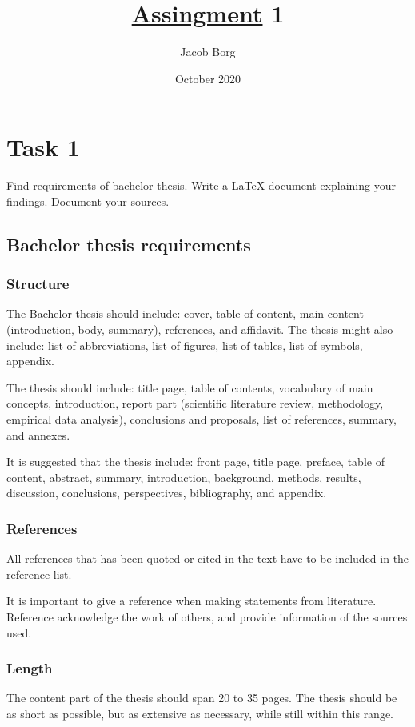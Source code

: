 \documentclass[a4paper]{article}
\title{\href{https://datsoftlyngby.github.io/soft2020fall/resources/8af56d7d-assignment-01.pdf}{Assingment} 1}
\author{Jacob Borg}
\date{October 2020}
\begin{document}
\maketitle
\tableofcontents

\section{Task 1}
Find requirements of bachelor thesis. Write a \LaTeX -document explaining your
findings. Document your sources.

\subsection{Bachelor thesis requirements}

\subsubsection{Structure}
The Bachelor thesis should include: cover, table of content, main content (introduction, body, summary), references, and affidavit. The thesis might also include: list of abbreviations, list of figures, list of tables, list of symbols, appendix.\cite{unimannheim2014guidelines}

\noindent The thesis should include: title page, table of contents, vocabulary of main concepts, introduction, report part (scientific literature review, methodology, empirical data analysis), conclusions and proposals, list of references, summary, and annexes.\cite{mru2018requirements}

\noindent It is suggested that the thesis include: front page, title page, preface, table of content, abstract, summary, introduction, background, methods, results, discussion, conclusions, perspectives, bibliography, and appendix.\cite{au2020guidelines}

\subsubsection{References}
All references that has been quoted or cited in the text have to be included in the reference list.\cite{unimannheim2014guidelines}

\noindent It is important to give a reference when making statements from literature. Reference acknowledge the work of others, and provide information of the sources used.\cite{au2020guidelines}

\subsubsection{Length}
The content part of the thesis should span 20 to 35 pages. The thesis should be as short as possible, but as extensive as necessary, while still within this range.\cite{unimannheim2014guidelines}
\end{document}
